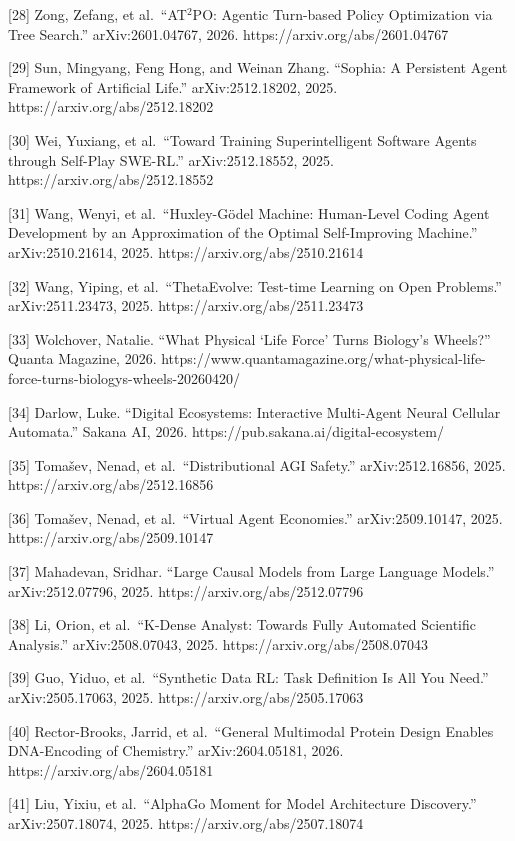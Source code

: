 \documentclass[11pt]{article}
\begin{document}
{[}28{]} Zong, Zefang, et al.~``AT\(^2\)PO: Agentic Turn-based Policy Optimization via Tree Search.'' arXiv:2601.04767, 2026. https://arxiv.org/abs/2601.04767

{[}29{]} Sun, Mingyang, Feng Hong, and Weinan Zhang. ``Sophia: A Persistent Agent Framework of Artificial Life.'' arXiv:2512.18202, 2025. https://arxiv.org/abs/2512.18202

{[}30{]} Wei, Yuxiang, et al.~``Toward Training Superintelligent Software Agents through Self-Play SWE-RL.'' arXiv:2512.18552, 2025. https://arxiv.org/abs/2512.18552

{[}31{]} Wang, Wenyi, et al.~``Huxley-Gödel Machine: Human-Level Coding Agent Development by an Approximation of the Optimal Self-Improving Machine.'' arXiv:2510.21614, 2025. https://arxiv.org/abs/2510.21614

{[}32{]} Wang, Yiping, et al.~``ThetaEvolve: Test-time Learning on Open Problems.'' arXiv:2511.23473, 2025. https://arxiv.org/abs/2511.23473

{[}33{]} Wolchover, Natalie. ``What Physical `Life Force' Turns Biology's Wheels?'' Quanta Magazine, 2026. https://www.quantamagazine.org/what-physical-life-force-turns-biologys-wheels-20260420/

{[}34{]} Darlow, Luke. ``Digital Ecosystems: Interactive Multi-Agent Neural Cellular Automata.'' Sakana AI, 2026. https://pub.sakana.ai/digital-ecosystem/

{[}35{]} Tomašev, Nenad, et al.~``Distributional AGI Safety.'' arXiv:2512.16856, 2025. https://arxiv.org/abs/2512.16856

{[}36{]} Tomašev, Nenad, et al.~``Virtual Agent Economies.'' arXiv:2509.10147, 2025. https://arxiv.org/abs/2509.10147

{[}37{]} Mahadevan, Sridhar. ``Large Causal Models from Large Language Models.'' arXiv:2512.07796, 2025. https://arxiv.org/abs/2512.07796

{[}38{]} Li, Orion, et al.~``K-Dense Analyst: Towards Fully Automated Scientific Analysis.'' arXiv:2508.07043, 2025. https://arxiv.org/abs/2508.07043

{[}39{]} Guo, Yiduo, et al.~``Synthetic Data RL: Task Definition Is All You Need.'' arXiv:2505.17063, 2025. https://arxiv.org/abs/2505.17063

{[}40{]} Rector-Brooks, Jarrid, et al.~``General Multimodal Protein Design Enables DNA-Encoding of Chemistry.'' arXiv:2604.05181, 2026. https://arxiv.org/abs/2604.05181

{[}41{]} Liu, Yixiu, et al.~``AlphaGo Moment for Model Architecture Discovery.'' arXiv:2507.18074, 2025. https://arxiv.org/abs/2507.18074
\end{document}
